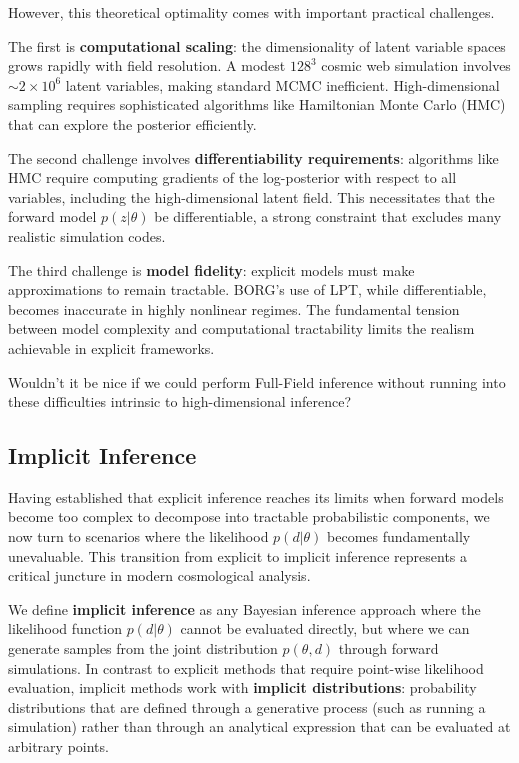 \documentclass{SciPost}
\begin{document}
However, this theoretical optimality comes with important practical challenges. 

The first is \textbf{computational scaling}: the dimensionality of latent variable spaces grows rapidly with field resolution. A modest $128^3$ cosmic web simulation involves $\sim 2 \times 10^6$ latent variables, making standard MCMC inefficient. High-dimensional sampling requires sophisticated algorithms like Hamiltonian Monte Carlo (HMC) that can explore the posterior efficiently.

The second challenge involves \textbf{differentiability requirements}: algorithms like HMC require computing gradients of the log-posterior with respect to all variables, including the high-dimensional latent field. This necessitates that the forward model $p(z|\theta)$ be differentiable, a strong constraint that excludes many realistic simulation codes.

The third challenge is \textbf{model fidelity}: explicit models must make approximations to remain tractable. BORG's use of LPT, while differentiable, becomes inaccurate in highly nonlinear regimes. The fundamental tension between model complexity and computational tractability limits the realism achievable in explicit frameworks.

\bigskip

Wouldn't it be nice if we could perform Full-Field inference without running into these difficulties intrinsic to high-dimensional inference?

\subsection{Implicit Inference}

Having established that explicit inference reaches its limits when forward models become too complex to decompose into tractable probabilistic components, we now turn to scenarios where the likelihood $p(d|\theta)$ becomes fundamentally unevaluable. This transition from explicit to implicit inference represents a critical juncture in modern cosmological analysis.

We define \textbf{implicit inference} as any Bayesian inference approach where the likelihood function $p(d|\theta)$ cannot be evaluated directly, but where we can generate samples from the joint distribution $p(\theta, d)$ through forward simulations. In contrast to explicit methods that require point-wise likelihood evaluation, implicit methods work with \textbf{implicit distributions}: probability distributions that are defined through a generative process (such as running a simulation) rather than through an analytical expression that can be evaluated at arbitrary points.
\end{document}
